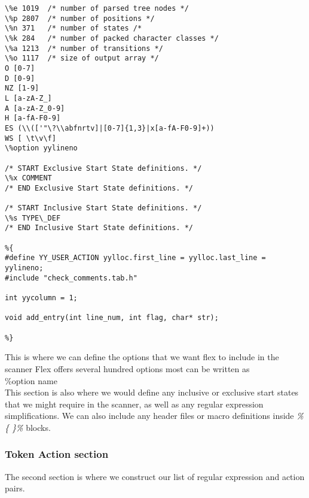 \begingroup
    \fontsize{8pt}{8pt}\selectfont
\begin{verbatim}
\%e 1019  /* number of parsed tree nodes */
\%p 2807  /* number of positions */
\%n 371   /* number of states /*
\%k 284   /* number of packed character classes */
\%a 1213  /* number of transitions */
\%o 1117  /* size of output array */
O [0-7]
D [0-9]
NZ [1-9]
L [a-zA-Z_]
A [a-zA-Z_0-9]
H [a-fA-F0-9]
ES (\\(['"\?\\abfnrtv]|[0-7]{1,3}|x[a-fA-F0-9]+))
WS [ \t\v\f]
\%option yylineno

/* START Exclusive Start State definitions. */
\%x COMMENT
/* END Exclusive Start State definitions. */

/* START Inclusive Start State definitions. */
\%s TYPE\_DEF
/* END Inclusive Start State definitions. */

%{
#define YY_USER_ACTION yylloc.first_line = yylloc.last_line = yylineno;
#include "check_comments.tab.h"

int yycolumn = 1;

void add_entry(int line_num, int flag, char* str);

%}

\end{verbatim}
\endgroup

\noindent This is where we can define the options that we want flex to include 
in the scanner Flex offers several hundred options most can be written as\\
\%option name \\
This section is also where we would define any inclusive or exclusive start
states that we might require in the scanner, as well as any regular expression
simplifications. We can also include any 
header files or macro definitions inside \emph{\%\{ \}\%} blocks.


\subsubsection{Token Action section} 
\noindent The second section is where we construct our list of regular expression and 
action pairs.

